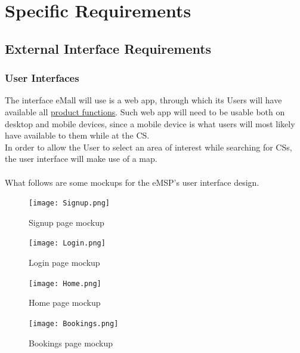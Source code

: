 \documentclass[11pt]{article}
\begin{document}
\newpage

\section{Specific Requirements}
\label{section:specificRequirements}

\subsection{External Interface Requirements}

\subsubsection{User Interfaces}

The interface eMall will use is a web app, through which its Users will have available all \hyperref[subsec:prodfunctions]{product functions}. Such web app will need to be usable both on desktop and mobile devices, since a mobile device is what users will most likely have available to them while at the CS. \\
In order to allow the User to select an area of interest while searching for CSs, the user interface will make use of a map. \\
\\
What follows are some mockups for the eMSP's user interface design.

\begin{figure}[!ht]
    \centering
    \texttt{[image: Signup.png]}
    \caption{Signup page mockup}
    \label{fig:my_label}
\end{figure}

\newpage

\begin{figure}[!ht]
    \centering
    \texttt{[image: Login.png]}
    \caption{Login page mockup}
    \label{fig:my_label}
\end{figure}

\begin{figure}[!ht]
    \centering
    \texttt{[image: Home.png]}
    \caption{Home page mockup}
    \label{fig:my_label}
\end{figure}

\newpage

\begin{figure}[!ht]
    \centering
    \texttt{[image: Bookings.png]}
    \caption{Bookings page mockup}
    \label{fig:my_label}
\end{figure}
\end{document}
